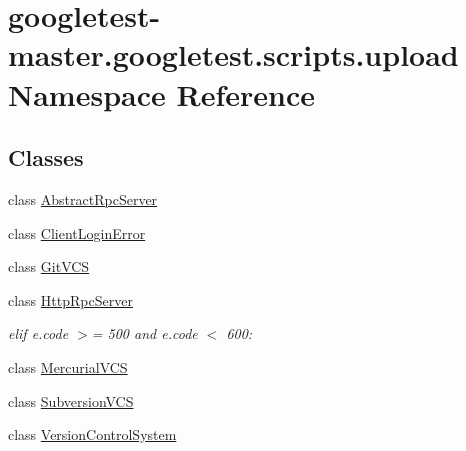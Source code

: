 \hypertarget{namespacegoogletest-master_1_1googletest_1_1scripts_1_1upload}{}\section{googletest-\/master.googletest.\+scripts.\+upload Namespace Reference}
\label{namespacegoogletest-master_1_1googletest_1_1scripts_1_1upload}
\subsection*{Classes}
\begin{DoxyCompactItemize}
\item 
class \mbox{\hyperlink{classgoogletest-master_1_1googletest_1_1scripts_1_1upload_1_1_abstract_rpc_server}{Abstract\+Rpc\+Server}}
\item 
class \mbox{\hyperlink{classgoogletest-master_1_1googletest_1_1scripts_1_1upload_1_1_client_login_error}{Client\+Login\+Error}}
\item 
class \mbox{\hyperlink{classgoogletest-master_1_1googletest_1_1scripts_1_1upload_1_1_git_v_c_s}{Git\+V\+CS}}
\item 
class \mbox{\hyperlink{classgoogletest-master_1_1googletest_1_1scripts_1_1upload_1_1_http_rpc_server}{Http\+Rpc\+Server}}
\begin{DoxyCompactList}\small\item\em elif e.\+code $>$= 500 and e.\+code $<$ 600\+: \end{DoxyCompactList}\item 
class \mbox{\hyperlink{classgoogletest-master_1_1googletest_1_1scripts_1_1upload_1_1_mercurial_v_c_s}{Mercurial\+V\+CS}}
\item 
class \mbox{\hyperlink{classgoogletest-master_1_1googletest_1_1scripts_1_1upload_1_1_subversion_v_c_s}{Subversion\+V\+CS}}
\item 
class \mbox{\hyperlink{classgoogletest-master_1_1googletest_1_1scripts_1_1upload_1_1_version_control_system}{Version\+Control\+System}}
\end{DoxyCompactItemize}
